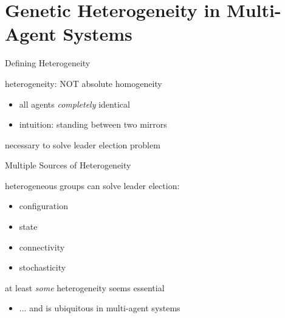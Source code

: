 \section{Genetic Heterogeneity in Multi-Agent Systems}

\begin{frame}{Defining Heterogeneity}

\Large

heterogeneity: NOT absolute homogeneity
\begin{itemize}
\item all agents \textit{completely} identical
\item intuition: standing between two mirrors
\end{itemize}

\vspace{2ex}

necessary to solve leader election problem \cite{angluin1980local,banda2015configuration}

\end{frame}

\begin{frame}{Multiple Sources of Heterogeneity}

heterogeneous groups can solve leader election:
\begin{itemize}
\item configuration \cite{frederickson1987electing}
\item state \cite{banda2015configuration}
\item connectivity \cite{antonoiu1996self}
\item stochasticity \cite{itai1981symmetry}
\end{itemize}

\vspace{2ex}

at least \textit{some} heterogeneity seems essential
\begin{itemize}
\item ... and is ubiquitous in multi-agent systems \cite{atodd2015quantitative, perna2012individual, fayeez2017h}
\end{itemize}


\end{frame}

